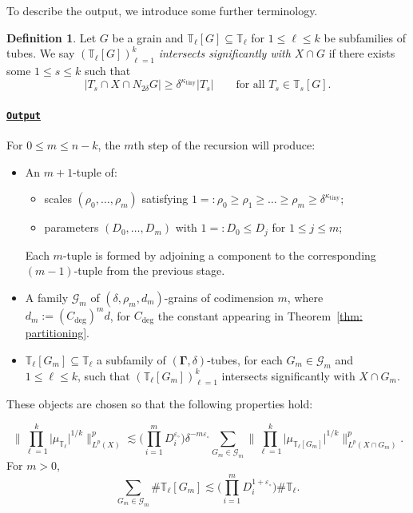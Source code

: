 \documentclass[reqno]{amsart}
\numberwithin{equation}{section}
\newcommand{\T}{\mathbb{T}}
\newcommand{\cG}{\mathcal{G}}
\newcommand{\bdGamma}{\boldsymbol{\Gamma}}
\theoremstyle{plain}
\theoremstyle{definition}
\newtheorem{definition}[theorem]{Definition}
\newcommand{\ttiny}{\mathrm{tiny}}
\begin{document}
To describe the output, we introduce some further terminology. 

\begin{definition} Let $G$ be a grain and $\T_{\ell}[G] \subseteq \T_{\ell}$ for $1 \leq \ell \leq k$ be subfamilies of tubes. We say $(\T_{\ell}[G])_{\ell = 1}^k$ \textit{intersects significantly with $X \cap G$} if there exists some $1 \leq s \leq k$ such that
\begin{equation*}
    |T_s \cap X \cap N_{2\delta}G| \geq \delta^{\kappa_{\ttiny}} |T_s| \qquad \textrm{for all $T_s \in \T_s[G]$.}
\end{equation*}
\end{definition}


\paragraph{\underline{\texttt{Output}}} For $0 \leq m \leq n-k$, the $m$th step of the recursion will produce:
\begin{itemize}
    \item An $m+1$-tuple of:
    \begin{itemize}
        \item scales $(\rho_0, \dots, \rho_m)$ satisfying $1 =: \rho_0 \geq \rho_1 \geq  \dots \geq \rho_m \geq \delta^{\kappa_{\ttiny}}$; 
        \item parameters $(D_0, \dots, D_m)$ with $1 =: D_0 \leq D_j$ for $1 \leq j \leq m$;
    \end{itemize}
    Each $m$-tuple is formed by adjoining a component to the corresponding $(m-1)$-tuple from the previous stage.
    \item A family $\cG_m$ of $(\delta, \rho_m, d_m)$-grains of codimension $m$, where $d_m := (C_{\deg})^m d$,
    for $C_{\deg}$ the constant appearing in Theorem~\ref{thm: partitioning}.
    \item $\T_{\ell}[G_m] \subseteq \T_{\ell}$ a subfamily of $(\bdGamma, \delta)$-tubes, for each $G_m \in \cG_m$ and $1 \leq \ell \leq k$, such that $(\T_{\ell}[G_m])_{\ell = 1}^k$ intersects significantly with $X \cap G_m$.
\end{itemize}
These objects are chosen so that the following properties hold: \medskip

\begin{equation}\tag*{$(1)_m$}
      \Big\|\prod_{\ell = 1}^k \big|\mu_{\T_{\ell}} \big|^{1/k}\Big\|_{L^p(X)}^p \lesssim \Big(\prod_{i = 1}^m D_i^{\varepsilon_{\circ}} \Big) \delta^{-m\varepsilon_{\circ}} \sum_{G_m \in \cG_m} \Big\|\prod_{\ell = 1}^k \big|\mu_{\T_{\ell}[G_m]} \big|^{1/k}\Big\|_{L^p(X \cap G_m)}^p.
\end{equation}
  For $m > 0$, 
\begin{equation}\tag*{$(2)_m$}
    \sum_{G_m \in \cG_m} \# \T_{\ell}[G_m] \lesssim \Big(\prod_{i=1}^m D_i^{1 + \varepsilon_{\circ}}\Big) \# \T_{\ell}.
\end{equation}
\end{document}
